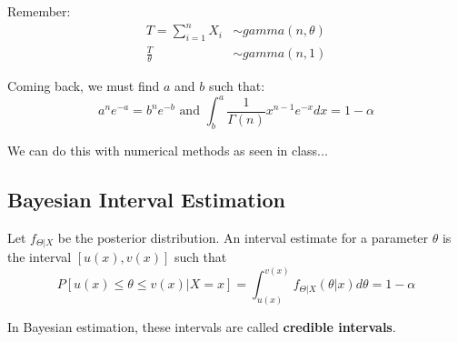 \documentclass{article}
\begin{document}
\begin{enumerate}
    Remember:
    \begin{equation*}
        \begin{split}
            T = \sum_{i=1}^n X_i &\sim gamma(n,\theta)\\
            \frac{T}{\theta} &\sim gamma(n,1)
        \end{split}
    \end{equation*}
    
    Coming back, we must find $a$ and $b$ such that:
     \begin{equation*}
        a^n e^{-a} = b^n e^{-b} \text{ and } \int_{b}^a \frac{1}{\Gamma(n)} x^{n-1} e^{-x}dx = 1-\alpha
    \end{equation*}
    
    We can do this with numerical methods as seen in class...
\end{enumerate}

\subsection{Bayesian Interval Estimation}

Let $f_{\Theta|X}$ be the posterior distribution. An interval estimate for a parameter $\theta$ is the interval $[u(x),v(x)]$ such that
\begin{equation*}
    P[u(x) \leq \theta \leq v(x) | X=x] = \int_{u(x)}^{v(x)} f_{\Theta|X}(\theta|x) d\theta = 1-\alpha
\end{equation*}

In Bayesian estimation, these intervals are called \textbf{credible intervals}.
\end{document}
